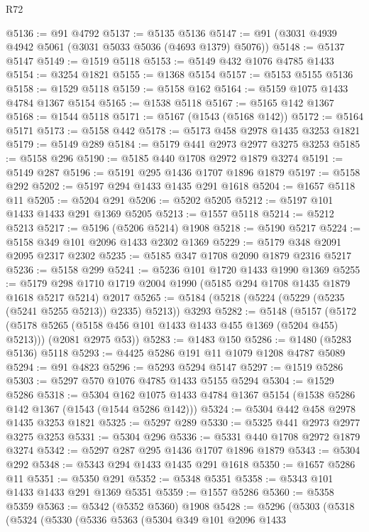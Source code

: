 \begin{lexlean}{R72}
\begin{coremodule}
@5136 := @91 @4792
@5137 := @5135 @5136
@5147 := @91 (@3031 @4939 @4942 @5061 (@3031 @5033 @5036 (@4693 @1379) @5076))
@5148 := @5137 @5147
@5149 := @1519 @5118
@5153 := @5149 @432 @1076 @4785 @1433
@5154 := @3254 @1821
@5155 := @1368 @5154
@5157 := @5153 @5155 @5136
@5158 := @1529 @5118
@5159 := @5158 @162
@5164 := @5159 @1075 @1433 @4784 @1367 @5154
@5165 := @1538 @5118
@5167 := @5165 @142 @1367
@5168 := @1544 @5118
@5171 := @5167 (@1543 (@5168 @142))
@5172 := @5164 @5171
@5173 := @5158 @442
@5178 := @5173 @458 @2978 @1435 @3253 @1821
@5179 := @5149 @289
@5184 := @5179 @441 @2973 @2977 @3275 @3253
@5185 := @5158 @296
@5190 := @5185 @440 @1708 @2972 @1879 @3274
@5191 := @5149 @287
@5196 := @5191 @295 @1436 @1707 @1896 @1879
@5197 := @5158 @292
@5202 := @5197 @294 @1433 @1435 @291 @1618
@5204 := @1657 @5118 @11
@5205 := @5204 @291
@5206 := @5202 @5205
@5212 := @5197 @101 @1433 @1433 @291 @1369 @5205
@5213 := @1557 @5118
@5214 := @5212 @5213
@5217 := @5196 (@5206 @5214) @1908
@5218 := @5190 @5217
@5224 := @5158 @349 @101 @2096 @1433 @2302 @1369
@5229 := @5179 @348 @2091 @2095 @2317 @2302
@5235 := @5185 @347 @1708 @2090 @1879 @2316 @5217
@5236 := @5158 @299
@5241 := @5236 @101 @1720 @1433 @1990 @1369
@5255 := @5179 @298 @1710 @1719 @2004 @1990 (@5185 @294 @1708 @1435 @1879 @1618 @5217 @5214) @2017
@5265 := @5184 (@5218 (@5224 (@5229 (@5235 (@5241 @5255 @5213)) @2335) @5213)) @3293
@5282 := @5148
    (@5157
      (@5172 (@5178 @5265 (@5158 @456 @101 @1433 @1433 @455 @1369 (@5204 @455) @5213)))
      (@2081 @2975 @53))
@5283 := @1483 @150
@5286 := @1480 (@5283 @5136) @5118
@5293 := @4425 @5286 @191 @11 @1079 @1208 @4787 @5089
@5294 := @91 @4823
@5296 := @5293 @5294 @5147
@5297 := @1519 @5286
@5303 := @5297 @570 @1076 @4785 @1433 @5155 @5294
@5304 := @1529 @5286
@5318 := @5304
    @162
    @1075
    @1433
    @4784
    @1367
    @5154
    (@1538 @5286 @142 @1367 (@1543 (@1544 @5286 @142)))
@5324 := @5304 @442 @458 @2978 @1435 @3253 @1821
@5325 := @5297 @289
@5330 := @5325 @441 @2973 @2977 @3275 @3253
@5331 := @5304 @296
@5336 := @5331 @440 @1708 @2972 @1879 @3274
@5342 := @5297 @287 @295 @1436 @1707 @1896 @1879
@5343 := @5304 @292
@5348 := @5343 @294 @1433 @1435 @291 @1618
@5350 := @1657 @5286 @11
@5351 := @5350 @291
@5352 := @5348 @5351
@5358 := @5343 @101 @1433 @1433 @291 @1369 @5351
@5359 := @1557 @5286
@5360 := @5358 @5359
@5363 := @5342 (@5352 @5360) @1908
@5428 := @5296
    (@5303
      (@5318
        (@5324
          (@5330
            (@5336
              @5363
              (@5304
                @349
                @101
                @2096
                @1433

\end{coremodule}
\end{lexlean}
